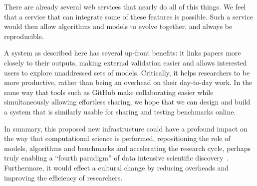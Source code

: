 \documentclass[conference]{IEEEtran}
\begin{document}
There are already several web services that nearly do all of this
things. We feel that a service that can integrate some of these
features is possible. Such a service would then allow algorithms and
models to evolve together, and always be reproducible.

A system as described here has several up-front benefits: it links
papers more closely to their outputs, making external validation
easier and allows interested users to explore unaddressed sets of
models. Critically, it helps researchers to be more productive, rather
than being an overhead on their day-to-day work. In the same way that
tools such as GitHub make collaborating easier while simultaneously
allowing effortless sharing, we hope that we can design and build a
system that is similarly usable for sharing and testing benchmarks
online.

In summary, this proposed new infrastructure could have a profound
impact on the way that computational science is performed,
repositioning the role of models, algorithms and benchmarks and
accelerating the research cycle, perhaps truly enabling a ``fourth
paradigm'' of data intensive scientific
discovery~\cite{hey:2009}. Furthermore, it would effect a cultural
change by reducing overheads and improving the efficiency of
researchers.





\end{document}
